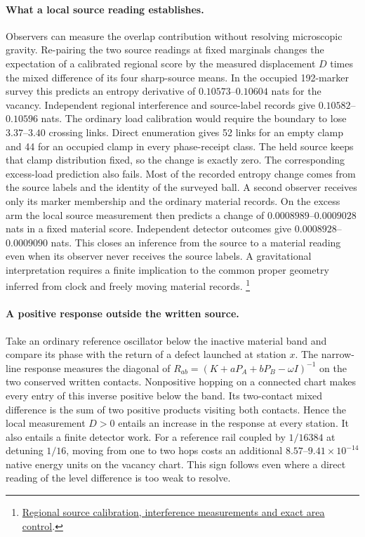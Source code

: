 \documentclass[11pt]{article}
\begin{document}
\paragraph{What a local source reading establishes.}
Observers can measure the overlap contribution without resolving microscopic
gravity. Re-pairing the two source readings at fixed marginals changes the
expectation of a calibrated regional score by the measured displacement
$D$ times the mixed difference of its four sharp-source means. In the
occupied 192-marker survey this predicts an entropy derivative of
$0.10573$--$0.10604$ nats for the vacancy. Independent regional
interference and source-label records give $0.10582$--$0.10596$ nats.
The ordinary load calibration would require the boundary to lose
$3.37$--$3.40$ crossing links. Direct enumeration gives 52 links for
an empty clamp and 44 for an occupied clamp in every phase-receipt
class. The held source keeps that clamp distribution fixed, so the change
is exactly zero. The corresponding excess-load prediction also fails.
Most of the recorded entropy change comes from the source labels and the
identity of the surveyed ball. A second observer receives only its marker
membership and the ordinary material records. On the excess arm the
local source measurement then predicts a change of $0.0008989$--$0.0009028$
nats in a fixed material score. Independent detector outcomes give
$0.0008928$--$0.0009090$ nats. This closes an inference from the source to
a material reading even when its observer never receives the source labels.
A gravitational interpretation requires a finite implication to the common
proper geometry inferred from clock and freely moving material records.%
\footnote{\href{https://github.com/FloatingPragma/observer-patch-holography/blob/main/model/experiments/interval_echo_shell_flux/product_address/green_response/material_recoil/overlap_source/native_boundary/stock/aperture/COHERENT_RESULTS.md}{Regional source calibration, interference measurements and exact area control}.}

\paragraph{A positive response outside the written source.}
Take an ordinary reference oscillator below the inactive material band and
compare its phase with the return of a defect launched at station \(x\).
The narrow-line response measures the diagonal of
\(R_{ab}=(K+aP_A+bP_B-\omega I)^{-1}\) on the two conserved written
contacts. Nonpositive hopping on a connected chart makes every entry of
this inverse positive below the band. Its two-contact mixed difference
is the sum of two positive products visiting both contacts. Hence the
local measurement \(D>0\) entails an increase in the response at every
station. It also entails a finite detector work. For a reference rail
coupled by \(1/16384\) at detuning \(1/16\), moving from one to two hops
costs an additional \(8.57\)--\(9.41\times10^{-14}\) native energy units
on the vacancy chart. This sign follows even where a direct reading of
the level difference is too weak to resolve.
\end{document}
